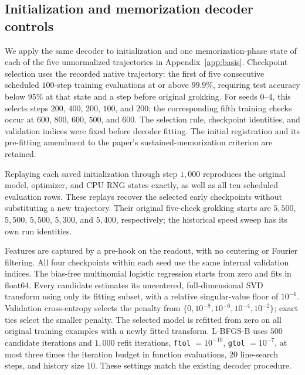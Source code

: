 \subsection{Initialization and memorization decoder controls}
\label{app:decoder-controls}

We apply the same decoder to initialization and one memorization-phase state of each of the five unnormalized trajectories in Appendix~\ref{app:basis}. Checkpoint selection uses the recorded native trajectory: the first of five consecutive scheduled $100$-step training evaluations at or above $99.9\%$, requiring test accuracy below $95\%$ at that state and a step before original grokking. For seeds $0$--$4$, this selects steps $200$, $400$, $200$, $100$, and $200$; the corresponding fifth training checks occur at $600$, $800$, $600$, $500$, and $600$. The selection rule, checkpoint identities, and validation indices were fixed before decoder fitting. The initial registration and its pre-fitting amendment to the paper's sustained-memorization criterion are retained.

Replaying each saved initialization through step $1{,}000$ reproduces the original model, optimizer, and CPU RNG states exactly, as well as all ten scheduled evaluation rows. These replays recover the selected early checkpoints without substituting a new trajectory. Their original five-check grokking starts are $5{,}500$, $5{,}500$, $5{,}500$, $5{,}300$, and $5{,}400$, respectively; the historical speed sweep has its own run identities.

Features are captured by a pre-hook on the readout, with no centering or Fourier filtering. All four checkpoints within each seed use the same internal validation indices. The bias-free multinomial logistic regression starts from zero and fits in float64. Every candidate estimates its uncentered, full-dimensional SVD transform using only its fitting subset, with a relative singular-value floor of $10^{-6}$. Validation cross-entropy selects the penalty from $\{0,10^{-8},10^{-6},10^{-4},10^{-2}\}$; exact ties select the smaller penalty. The selected model is refitted from zero on all original training examples with a newly fitted transform. L-BFGS-B uses $500$ candidate iterations and $1{,}000$ refit iterations, \texttt{ftol} $=10^{-10}$, \texttt{gtol} $=10^{-7}$, at most three times the iteration budget in function evaluations, $20$ line-search steps, and history size $10$. These settings match the existing decoder procedure.



